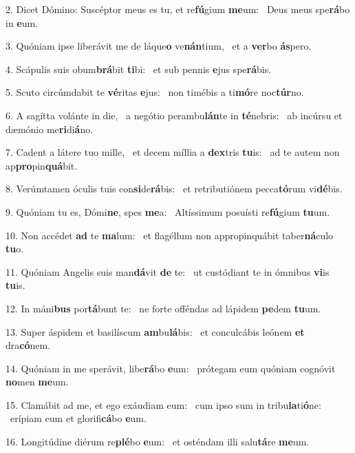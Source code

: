 2. Dicet Dómino: Suscéptor meus es tu, et re\textbf{fú}gium \textbf{me}um: \ast\  Deus meus spe\textbf{rá}bo in \textbf{e}um.\

3. Quóniam ipse liberávit me de láque\textbf{o} ve\textbf{nán}tium, \ast\  et a \textbf{ver}bo \textbf{ás}pero.\

4. Scápulis suis obum\textbf{brá}bit \textbf{ti}bi: \ast\  et sub pennis \textbf{e}jus spe\textbf{rá}bis.\

5. Scuto circúmdabit te \textbf{vé}ritas \textbf{e}jus: \ast\  non timébis a ti\textbf{mó}re noc\textbf{túr}no.\

6. A sagítta volánte in die, \dag\  a negótio perambu\textbf{lán}te in \textbf{té}nebris: \ast\  ab incúrsu et dæmónio me\textbf{ri}di\textbf{á}no.\

7. Cadent a látere tuo mille, \dag\  et decem míllia a \textbf{dex}tris \textbf{tu}is: \ast\  ad te autem non ap\textbf{pro}pin\textbf{quá}bit.\

8. Verúmtamen óculis tuis con\textbf{si}de\textbf{rá}bis: \ast\  et retributiónem pecca\textbf{tó}rum vi\textbf{dé}bis.\

9. Quóniam tu es, Dómi\textbf{ne}, spes \textbf{me}a: \ast\  Altíssimum posuísti re\textbf{fú}gium \textbf{tu}um.\

10. Non accédet \textbf{ad} te \textbf{ma}lum: \ast\  et flagéllum non appropinquábit taber\textbf{ná}culo \textbf{tu}o.\

11. Quóniam Angelis suis man\textbf{dá}vit \textbf{de} te: \ast\  ut custódiant te in ómnibus \textbf{vi}is \textbf{tu}is.\

12. In máni\textbf{bus} por\textbf{tá}bunt te: \ast\  ne forte offéndas ad lápidem \textbf{pe}dem \textbf{tu}um.\

13. Super áspidem et basilíscum \textbf{am}bu\textbf{lá}bis: \ast\  et conculcábis leónem \textbf{et} dra\textbf{có}nem.\

14. Quóniam in me sperávit, libe\textbf{rá}bo \textbf{e}um: \ast\  prótegam eum quóniam cognóvit \textbf{no}men \textbf{me}um.\

15. Clamábit ad me, et ego exáudiam eum: \dag\  cum ipso sum in tribu\textbf{la}ti\textbf{ó}ne: \ast\  erípiam eum et glorifi\textbf{cá}bo \textbf{e}um.\

16. Longitúdine diérum re\textbf{plé}bo \textbf{e}um: \ast\  et osténdam illi salu\textbf{tá}re \textbf{me}um.\

